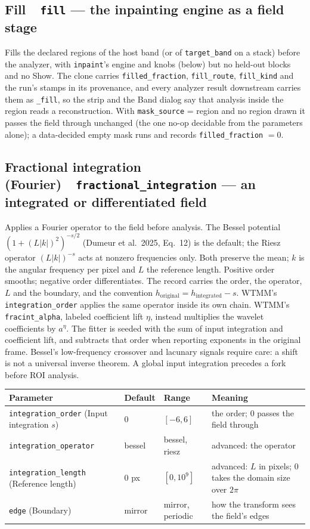 \documentclass[10pt]{article}
\newcommand{\dev}[1]{\texttt{#1}}
\newcommand{\tool}[2]{#1~\textperiodcentered~\dev{#2}}
\begin{document}
\subsection{\tool{Fill}{fill} --- the inpainting engine as a field stage}
Fills the declared regions of the host band (or of \texttt{target\_band} on a stack) before the
analyzer, with \dev{inpaint}'s engine and knobs (below) but no held-out blocks and no Show.
The clone carries \texttt{filled\_fraction}, \texttt{fill\_route}, \texttt{fill\_kind} and the
run's stamps in its provenance, and every analyzer result downstream carries them as
\texttt{\_fill}, so the strip and the Band dialog say that analysis inside the region reads a
reconstruction. With \texttt{mask\_source} = region and no region drawn it passes the field
through unchanged (the one no-op decidable from the parameters alone); a data-decided empty
mask runs and records \texttt{filled\_fraction} $=0$.

\subsection{\tool{Fractional integration (Fourier)}{fractional\_integration} --- an integrated or differentiated field}\label{sec:fractional-integration}
Applies a Fourier operator to the field before analysis. The Bessel potential
$(1 + (L|k|)^2)^{-s/2}$ (Dumeur et al.\ 2025, Eq.~12) is the default; the Riesz operator
$(L|k|)^{-s}$ acts at nonzero frequencies only. Both preserve the mean; $k$ is the angular frequency
per pixel and $L$ the reference length. Positive order smooths; negative order differentiates. The
record carries the order, the operator, $L$ and the boundary, and the convention
$h_{\text{original}} = h_{\text{integrated}} - s$. WTMM's \texttt{integration\_order} applies the same
operator inside its own chain. WTMM's \texttt{fracint\_alpha}, labeled coefficient lift $\eta$,
instead multiplies the wavelet coefficients by $a^\eta$. The fitter is seeded with the sum of input
integration and coefficient lift, and subtracts that order when reporting exponents in the original
frame. Bessel's low-frequency crossover and lacunary signals require care: a shift is not a universal
inverse theorem. A global input integration precedes a fork before ROI analysis.

\begin{longtable}{L l l M}
\toprule Parameter & Default & Range & Meaning \\ \midrule
\texttt{integration\_order} (Input integration $s$) & 0 & $[-6,6]$ & the order; 0 passes the field through \\
\texttt{integration\_operator} & bessel & bessel, riesz & advanced: the operator \\
\texttt{integration\_length} (Reference length) & 0 px & $[0,10^9]$ & advanced: $L$ in pixels; 0 takes the domain size over $2\pi$ \\
\texttt{edge} (Boundary) & mirror & mirror, periodic & how the transform sees the field's edges \\
\bottomrule
\end{longtable}
\end{document}
